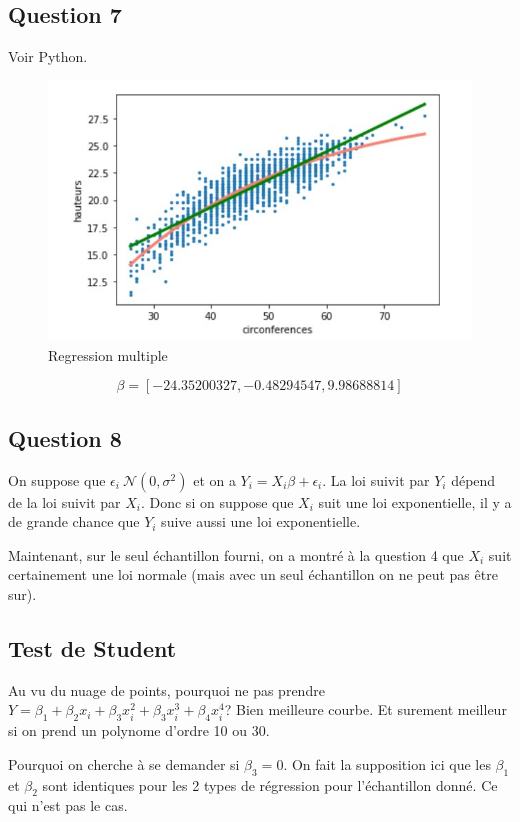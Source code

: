 \documentclass[]{book}
\theoremstyle{definition}
\begin{document}
\subsection*{Question 7}
Voir Python.

\begin{figure}
	\includegraphics[scale=1]{regression_multiple.jpg}
    \caption{Regression multiple}
    \label{fig:Regression multiple}
\end{figure}

$$\beta = [-24.35200327,  -0.48294547,   9.98688814]$$

\subsection*{Question 8}
On suppose que $\epsilon_i ~ \mathscr{N}(0,\sigma^2)$ et on a $Y_i = X_i\beta + \epsilon_i$. La loi suivit par $Y_i$ d\'epend de la loi suivit par $X_i$. Donc si on suppose que $X_i$ suit une loi exponentielle, il y a de grande chance que $Y_i$ suive aussi une loi exponentielle.

Maintenant, sur le seul \'echantillon fourni, on a montr\'e \`a la question 4 que $X_i$ suit certainement une loi normale (mais avec un seul \'echantillon on ne peut pas \^etre sur).


\subsection*{Test de Student}
Au vu du nuage de points, pourquoi ne pas prendre $Y = \beta_1 + \beta_2x_i + \beta_3x_i^2 + \beta_3x_i^3 + \beta_4x_i^4$? Bien meilleure courbe. Et surement meilleur si on prend un polynome d'ordre 10 ou 30.

Pourquoi on cherche \`a se demander si $\beta_3 = 0$. On fait la supposition ici que les $\beta_1$ et $\beta_2$ sont identiques pour les 2 types de r\'egression pour l'\'echantillon donn\'e. Ce qui n'est pas le cas.
\end{document}
